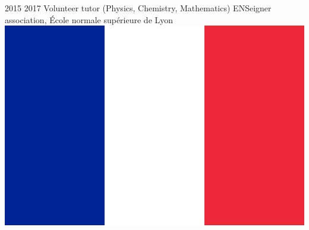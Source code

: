 \documentclass[a4paper]{cvtemplate_en} %
\begin{document}
\begin{cvbody}
\cvitem
	{2015}
	{2017}
	{Volunteer tutor (Physics, Chemistry, Mathematics)}
	{ENSeigner association, \'Ecole normale sup\'erieure de Lyon \includegraphics[height=0.8\myheight]{fr}}
	{}{}{}
	{}
	{\vspace{5pt}
	}

\end{cvbody}
\end{document}
